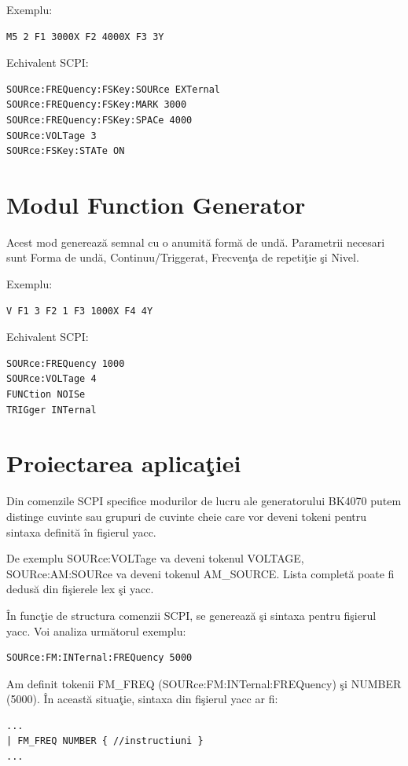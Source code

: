 Exemplu:
\begin{verbatim}
M5 2 F1 3000X F2 4000X F3 3Y
\end{verbatim}

Echivalent SCPI:
\begin{verbatim}
SOURce:FREQuency:FSKey:SOURce EXTernal
SOURce:FREQuency:FSKey:MARK 3000
SOURce:FREQuency:FSKey:SPACe 4000
SOURce:VOLTage 3
SOURce:FSKey:STATe ON
\end{verbatim}

\section{Modul Function Generator}
Acest mod genereaz\u{a} semnal cu o anumit\u{a} form\u{a} de und\u{a}. Parametrii necesari sunt Forma de und\u{a}, Continuu/Triggerat, Frecven\c{t}a de repeti\c{t}ie \c{s}i Nivel.

Exemplu:
\begin{verbatim}
V F1 3 F2 1 F3 1000X F4 4Y
\end{verbatim}

Echivalent SCPI:
\begin{verbatim}
SOURce:FREQuency 1000
SOURce:VOLTage 4
FUNCtion NOISe
TRIGger INTernal
\end{verbatim}

\section{Proiectarea aplica\c{t}iei}

Din comenzile SCPI specifice modurilor de lucru ale generatorului BK4070 putem distinge cuvinte sau grupuri de cuvinte cheie care vor deveni tokeni pentru sintaxa definit\u{a} \^{i}n fi\c{s}ierul yacc.

De exemplu SOURce:VOLTage va deveni tokenul VOLTAGE, SOURce:AM:SOURce va deveni tokenul AM\_SOURCE. Lista complet\u{a} poate fi dedus\u{a} din fi\c{s}ierele lex \c{s}i yacc.

\^{I}n func\c{t}ie de structura comenzii SCPI, se genereaz\u{a} \c{s}i sintaxa pentru fi\c{s}ierul yacc. Voi analiza urm\u{a}torul exemplu:

\begin{verbatim}
SOURce:FM:INTernal:FREQuency 5000
\end{verbatim}
Am definit tokenii FM\_FREQ (SOURce:FM:INTernal:FREQuency) \c{s}i NUMBER (5000). \^{I}n aceast\u{a} situa\c{t}ie, sintaxa din fi\c{s}ierul yacc ar fi:
\begin{verbatim}
...
| FM_FREQ NUMBER { //instructiuni }
...
\end{verbatim}

